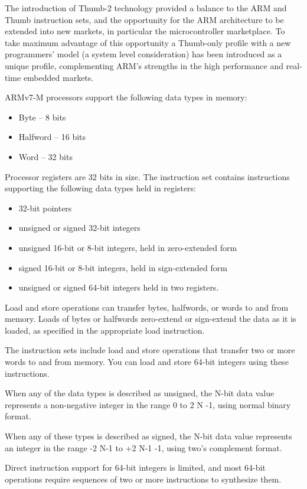 \documentclass[11pt]{report}
\begin{document}
		\par The introduction of Thumb-2 technology provided a balance to the ARM and Thumb instruction sets, and the opportunity for the ARM architecture to be extended into new markets, in particular the microcontroller marketplace. To take maximum advantage of this opportunity a Thumb-only profile with a new programmers’ model (a system level consideration) has been introduced as a unique profile, complementing ARM’s strengths in the high performance and real-time embedded markets.

		\par ARMv7-M processors support the following data types in memory:
		\begin{itemize}
			\item Byte -- 8 bits
			\item Halfword -- 16 bits
			\item Word -- 32 bits
		\end{itemize}
		
		\par Processor registers are 32 bits in size. The instruction set contains instructions supporting the following data
		types held in registers:
		\begin{itemize}
			\item 32-bit pointers
			\item unsigned or signed 32-bit integers
			\item unsigned 16-bit or 8-bit integers, held in zero-extended form
			\item signed 16-bit or 8-bit integers, held in sign-extended form
			\item unsigned or signed 64-bit integers held in two registers.
		\end{itemize}
		\par Load and store operations can transfer bytes, halfwords, or words to and from memory. Loads of bytes or halfwords zero-extend or sign-extend the data as it is loaded, as specified in the appropriate load instruction.
		\par The instruction sets include load and store operations that transfer two or more words to and from memory. You can load and store 64-bit integers using these instructions.
		\par When any of the data types is described as unsigned, the N-bit data value represents a non-negative integer in the range 0 to 2 N -1, using normal binary format.
		\par When any of these types is described as signed, the N-bit data value represents an integer in the range -2 N-1 to +2 N-1 -1, using two's complement format.
		\par Direct instruction support for 64-bit integers is limited, and most 64-bit operations require sequences of two or more instructions to synthesize them.
		
\end{document}
